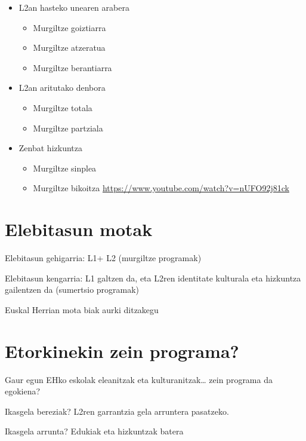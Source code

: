 \documentclass[
]{book}
\providecommand{\tightlist}{%
  \setlength{\itemsep}{0pt}\setlength{\parskip}{0pt}}
\begin{document}
\begin{itemize}
\tightlist
\item
  L2an hasteko unearen arabera

  \begin{itemize}
  \tightlist
  \item
    Murgiltze goiztiarra
  \item
    Murgiltze atzeratua
  \item
    Murgiltze berantiarra
  \end{itemize}
\item
  L2an aritutako denbora

  \begin{itemize}
  \tightlist
  \item
    Murgiltze totala
  \item
    Murgiltze partziala
  \end{itemize}
\item
  Zenbat hizkuntza

  \begin{itemize}
  \tightlist
  \item
    Murgiltze sinplea
  \item
    Murgiltze bikoitza \url{https://www.youtube.com/watch?v=nUFO92j81ck}
  \end{itemize}
\end{itemize}

\hypertarget{elebitasun-motak}{%
\section{Elebitasun motak}\label{elebitasun-motak}}

Elebitasun gehigarria: L1+ L2 (murgiltze programak)

Elebitasun kengarria: L1 galtzen da, eta L2ren identitate kulturala eta hizkuntza gailentzen da (sumertsio programak)

Euskal Herrian mota biak aurki ditzakegu

\hypertarget{etorkinekin-zein-programa}{%
\section{Etorkinekin zein programa?}\label{etorkinekin-zein-programa}}

Gaur egun EHko eskolak eleanitzak eta kulturanitzak\ldots{} zein programa da egokiena?

Ikasgela bereziak? L2ren garrantzia gela arruntera pasatzeko.

Ikasgela arrunta? Edukiak eta hizkuntzak batera
\end{document}
